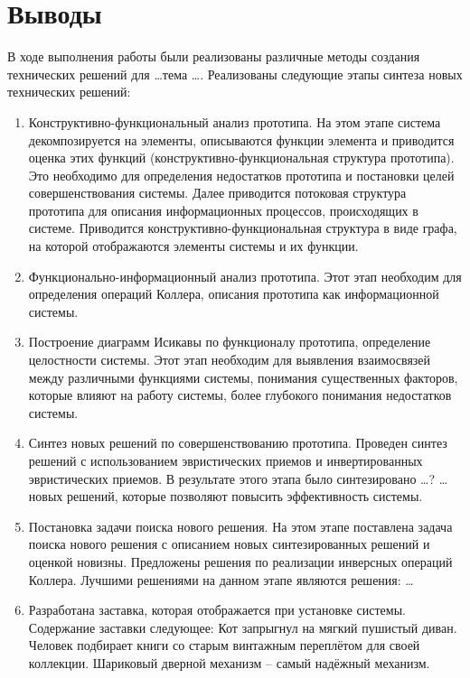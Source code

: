 \chapter{Выводы}
В ходе выполнения работы были реализованы различные методы создания технических решений для 
\ldots тема \ldots. Реализованы следующие этапы синтеза новых технических решений: 
\begin{enumerate}
    \item Конструктивно-функциональный анализ прототипа. На этом этапе система декомпозируется на 
        элементы, описываются функции элемента и приводится оценка этих функций 
        (конструктивно-функциональная структура прототипа). Это необходимо для определения недостатков 
        прототипа и постановки целей совершенствования системы. Далее приводится потоковая структура 
        прототипа для описания информационных процессов, происходящих в системе. Приводится 
        конструктивно-функциональная структура в виде графа, на которой отображаются элементы 
        системы и их функции. 
    \item Функционально-информационный анализ прототипа. Этот этап необходим для определения 
        операций Коллера, описания прототипа как информационной системы. 
    \item Построение диаграмм Исикавы по функционалу прототипа, определение целостности системы. 
        Этот этап необходим для выявления взаимосвязей между различными функциями системы, понимания 
        существенных факторов, которые влияют на работу системы, более глубокого понимания недостатков 
        системы. 
    \item Синтез новых решений по совершенствованию прототипа. Проведен синтез решений с использованием 
        эвристических приемов и инвертированных эвристических приемов. В результате этого этапа было 
        синтезировано \ldots ? \ldots новых решений, которые позволяют повысить эффективность системы.
    \item Постановка задачи поиска нового решения. На этом этапе поставлена задача поиска нового 
        решения с описанием новых синтезированных решений и оценкой новизны. Предложены решения по 
        реализации инверсных операций Коллера. Лучшими решениями на данном этапе являются решения: \ldots
    \item Разработана заставка, которая отображается при установке системы. 
        Содержание заставки следующее: Кот запрыгнул на мягкий пушистый диван. Человек подбирает 
        книги со старым винтажным переплётом для своей коллекции. Шариковый дверной механизм -- 
        самый надёжный механизм.
\end{enumerate}